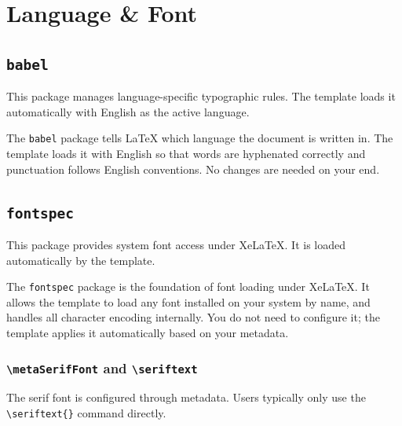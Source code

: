 \section{Language \& Font}

	\subsection{\texttt{babel}}
	\noindent\colorbox{themecolour!15}{\parbox{\linewidth}{\small This package manages language-specific typographic rules. The template loads it automatically with English as the active language.}}\vspace{0.5\baselineskip}
	
	The \texttt{babel} package tells \LaTeX{} which language the document is written in. The template loads it with English so that words are hyphenated correctly and punctuation follows English conventions. No changes are needed on your end.
	
	\subsection{\texttt{fontspec}}
	\noindent\colorbox{themecolour!15}{\parbox{\linewidth}{\small This package provides system font access under XeLaTeX. It is loaded automatically by the template.}}\vspace{0.5\baselineskip}
	
	The \texttt{fontspec} package is the foundation of font loading under Xe\LaTeX{}. It allows the template to load any font installed on your system by name, and handles all character encoding internally. You do not need to configure it; the template applies it automatically based on your metadata.
	
		\subsubsection{\texttt{\textbackslash metaSerifFont} and \texttt{\textbackslash seriftext}}
		\noindent\colorbox{themecolour!15}{\parbox{\linewidth}{\small The serif font is configured through metadata. Users typically only use the \texttt{\textbackslash seriftext\{\}} command directly.}}\vspace{0.5\baselineskip}
		
